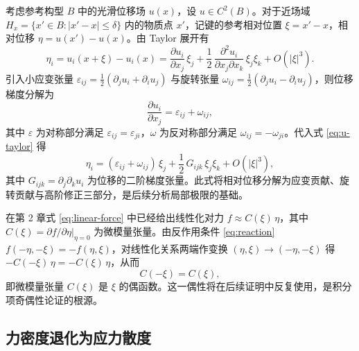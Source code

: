 考虑参考构型 $B$ 中的光滑位移场 $u(x)$，设 $u\in C^2(B)$。对于近场域 $H_x=\{x'\in B:|x'-x|\le\delta\}$ 内的物质点 $x'$，记键的参考相对位置 $\xi=x'-x$，相对位移 $\eta=u(x')-u(x)$。由 Taylor 展开有
\begin{equation}
\label{eq:u-taylor}
\eta_i = u_i(x+\xi)-u_i(x) = \frac{\partial u_i}{\partial x_j}\,\xi_j + \frac{1}{2}\,\frac{\partial^2 u_i}{\partial x_j \partial x_k}\,\xi_j\xi_k + O(|\xi|^3).
\end{equation}
引入小应变张量 $\varepsilon_{ij}=\tfrac{1}{2}(\partial_j u_i+\partial_i u_j)$ 与旋转张量 $\omega_{ij}=\tfrac{1}{2}(\partial_j u_i-\partial_i u_j)$，则位移梯度分解为
\begin{equation}
\label{eq:grad-decomp}
\frac{\partial u_i}{\partial x_j} = \varepsilon_{ij} + \omega_{ij},
\end{equation}
其中 $\varepsilon$ 为对称部分满足 $\varepsilon_{ij}=\varepsilon_{ji}$，$\omega$ 为反对称部分满足 $\omega_{ij}=-\omega_{ji}$。代入式 \eqref{eq:u-taylor} 得
\begin{equation}
\label{eq:eta-decomp-explicit}
\eta_i = (\varepsilon_{ij}+\omega_{ij})\,\xi_j + \frac{1}{2}\,G_{ijk}\,\xi_j\xi_k + O(|\xi|^3),
\end{equation}
其中 $G_{ijk}=\partial_j\partial_k u_i$ 为位移的二阶梯度张量。此式将相对位移分解为应变贡献、旋转贡献与高阶修正三部分，是后续分析局部极限的基础。

在第 2 章式 \eqref{eq:linear-force} 中已经给出线性化对力 $f\approx C(\xi)\,\eta$，其中 $C(\xi)=\partial f/\partial\eta|_{\eta=0}$ 为微模量张量。由反作用条件 \eqref{eq:reaction} $f(-\eta,-\xi)=-f(\eta,\xi)$，对线性化关系两端作变换 $(\eta,\xi)\to(-\eta,-\xi)$ 得 $-C(-\xi)\,\eta=-C(\xi)\,\eta$，从而
\begin{equation}
\label{eq:micro-modulus-even}
C(-\xi) = C(\xi),
\end{equation}
即微模量张量 $C(\xi)$ 是 $\xi$ 的偶函数。这一偶性将在后续证明中反复使用，是积分项奇偶性论证的根源。

\subsection{力密度退化为应力散度}
\label{subsec:force-to-stress-div}

